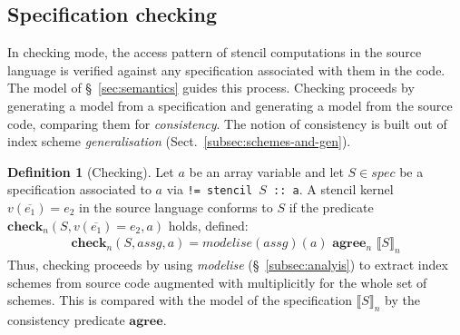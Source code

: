 \documentclass[10pt,preprint]{sigplanconf}
\newcounter{block}
\theoremstyle{definition}
\newtheorem{definition}[block]{Definition}
\newcommand{\interp}[1]{\llbracket{#1}\rrbracket}
\newcommand{\consAName}{\textbf{agree}}
\newcommand{\consSub}[3]{#2 \,\, \consAName{}_{#1} \,\,#3}
\begin{document}
\subsection{Specification checking}
\label{subsec:checking}

In checking mode, the access pattern of stencil computations in the
source language is verified against any specification associated with
them in the code. The model of
\S~\ref{sec:semantics} guides this process.  Checking
proceeds by generating a model from a specification and generating
a model from the source code, comparing them for
\emph{consistency}. The notion of consistency is built out of index scheme
\emph{generalisation} (Sect.~\ref{subsec:schemes-and-gen}).

\begin{definition}[Checking]
Let $a$ be an array variable and let
$S \in \textit{spec}$ be a specification associated to $a$
via \texttt{!= stencil $S$ :: a}. A stencil kernel
 $v(\overline{e_1}) = e_2$ in the source language
conforms to $S$ if the predicate $\textbf{check}_n(S, v(\overline{e_1}) = e_2, a)$ holds,
defined:
\begin{align*}
& \textbf{check}_n(S, \textit{assg}, a) =
  \consSub{n}{\textit{modelise}(\textit{assg})(a)}{\interp{S}_n}
&
\end{align*}
Thus, checking proceeds by using \textit{modelise}
(\S~\ref{subsec:analyis}) to extract index schemes from source code
augmented with multiplicitly for the whole set of schemes.
This is compared with the model of the specification $\interp{S}_n$ by
the consistency predicate $\consAName$.
\end{definition}
\end{document}
